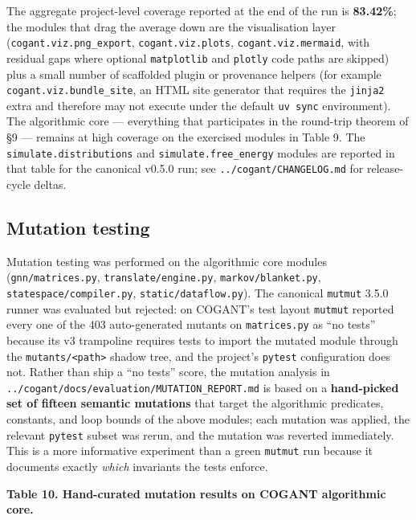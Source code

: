 \documentclass[
]{article}
\begin{document}
The aggregate project-level coverage reported at the end of the run is
\textbf{83.42\%}; the modules that drag the average down are the
visualisation layer (\texttt{cogant.viz.png\_export},
\texttt{cogant.viz.plots}, \texttt{cogant.viz.mermaid}, with residual
gaps where optional \texttt{matplotlib} and \texttt{plotly} code paths
are skipped) plus a small number of scaffolded plugin or provenance
helpers (for example \texttt{cogant.viz.bundle\_site}, an HTML site
generator that requires the \texttt{jinja2} extra and therefore may not
execute under the default \texttt{uv\ sync} environment). The
algorithmic core --- everything that participates in the round-trip
theorem of §9 --- remains at high coverage on the exercised modules in
Table 9. The \texttt{simulate.distributions} and
\texttt{simulate.free\_energy} modules are reported in that table for
the canonical v0.5.0 run; see \texttt{../cogant/CHANGELOG.md} for
release-cycle deltas.

\subsection{Mutation testing}\label{mutation-testing}

Mutation testing was performed on the algorithmic core modules
(\texttt{gnn/matrices.py}, \texttt{translate/engine.py},
\texttt{markov/blanket.py}, \texttt{statespace/compiler.py},
\texttt{static/dataflow.py}). The canonical \texttt{mutmut} 3.5.0 runner
was evaluated but rejected: on COGANT's test layout \texttt{mutmut}
reported every one of the 403 auto-generated mutants on
\texttt{matrices.py} as ``no tests'' because its v3 trampoline requires
tests to import the mutated module through the
\texttt{mutants/\textless{}path\textgreater{}} shadow tree, and the
project's \texttt{pytest} configuration does not. Rather than ship a
``no tests'' score, the mutation analysis in
\texttt{../cogant/docs/evaluation/MUTATION\_REPORT.md} is based on a
\textbf{hand-picked set of fifteen semantic mutations} that target the
algorithmic predicates, constants, and loop bounds of the above modules;
each mutation was applied, the relevant \texttt{pytest} subset was
rerun, and the mutation was reverted immediately. This is a more
informative experiment than a green \texttt{mutmut} run because it
documents exactly \emph{which} invariants the tests enforce.

\textbf{Table 10. Hand-curated mutation results on COGANT algorithmic
core.}
\end{document}

